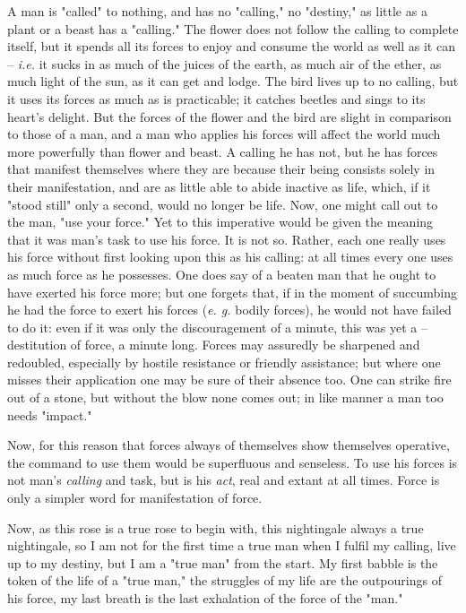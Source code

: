 \documentclass[a4paper]{book}
\begin{document}
A man is "{}called"{} to nothing, and has no "{}calling,"{} no "{}destiny,"{} 
as little as a plant or a beast has a "{}calling."{} The flower does not 
follow the calling to complete itself, but it spends all its forces to enjoy 
and consume the world as well as it can -- \textit{i.e.} it sucks in as much 
of the juices of the earth, as much air of the ether, as much light of the 
sun, as it can get and lodge. The bird lives up to no calling, but it uses its 
forces as much as is practicable; it catches beetles and sings to its heart's 
delight. But the forces of the flower and the bird are slight in comparison to 
those of a man, and a man who applies his forces will affect the world much 
more powerfully than flower and beast. A calling he has not, but he has forces 
that manifest themselves where they are because their being consists solely in 
their manifestation, and are as little able to abide inactive as life, which, 
if it "{}stood still"{} only a second, would no longer be life. Now, one might 
call out to the man, "{}use your force."{} Yet to this imperative would be 
given the meaning that it was man's task to use his force. It is not so. 
Rather, each one really uses his force without first looking upon this as his 
calling: at all times every one uses as much force as he possesses. One does 
say of a beaten man that he ought to have exerted his force more; but one 
forgets that, if in the moment of succumbing he had the force to exert his 
forces (\textit{e. g.} bodily forces), he would not have failed to do it: even 
if it was only the discouragement of a minute, this was yet a --destitution of 
force, a minute long. Forces may assuredly be sharpened and redoubled, 
especially by hostile resistance or friendly assistance; but where one misses 
their application one may be sure of their absence too. One can strike fire 
out of a stone, but without the blow none comes out; in like manner a man too 
needs "{}impact."{}

Now, for this reason that forces always of themselves show themselves 
operative, the command to use them would be superfluous and senseless. To use 
his forces is not man's \textit{calling} and task, but is his \textit{act}, 
real and extant at all times. Force is only a simpler word for manifestation 
of force.

Now, as this rose is a true rose to begin with, this nightingale always a true 
nightingale, so I am not for the first time a true man when I fulfil my 
calling, live up to my destiny, but I am a "{}true man"{} from the start. My 
first babble is the token of the life of a "{}true man,"{} the struggles of my 
life are the outpourings of his force, my last breath is the last exhalation 
of the force of the "{}man."{}
\end{document}
